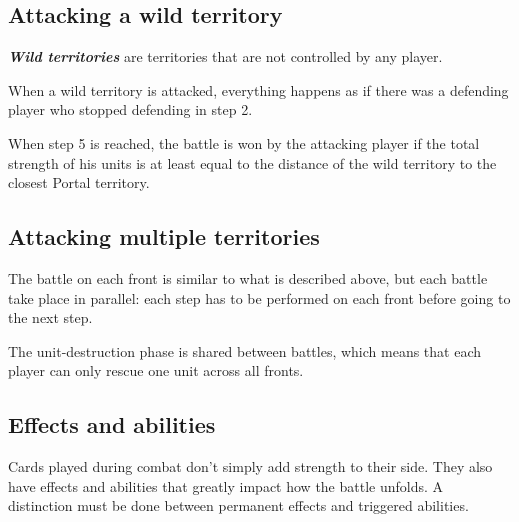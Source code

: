 \documentclass[a4paper]{article}
\begin{document}
  \subsection{Attacking a wild territory}
    
    \textbf{\textit{Wild territories}} are territories that are not controlled by any
    player.
    
    When a wild territory is attacked,
    everything happens as if there was a defending player who stopped defending
    in step 2.
    
    When step 5 is reached, the battle is won by the attacking player if the total
    strength of his units is at least equal to the distance of the wild territory
    to the closest Portal territory.
    

  \subsection{Attacking multiple territories}
    
    The battle on each front is similar to what is described above,
    but each battle take place in parallel:
    each step has to be performed on each front before going to the next step.
    
    The unit-destruction phase is shared between battles, which means that
    each player can only rescue one unit across all fronts.


\newpage
\subsection{Effects and abilities}

    Cards played during combat don't simply add strength to their side.
    They also have effects and abilities that greatly impact how the battle unfolds.
    A distinction must be done between permanent effects and triggered abilities.
\end{document}
